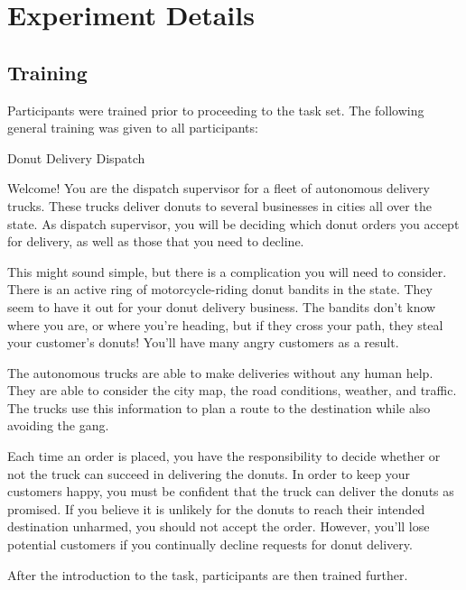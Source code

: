\section{Experiment Details}
\subsection{Training}
Participants were trained prior to proceeding to the task set. The following general training was given to all participants:

\begin{quoting}
    Donut Delivery Dispatch

    Welcome! You are the dispatch supervisor for a fleet of autonomous delivery trucks. These trucks deliver donuts to several businesses in cities all over the state. As dispatch supervisor, you will be deciding which donut orders you accept for delivery, as well as those that you need to decline.

    This might sound simple, but there is a complication you will need to consider. There is an active ring of motorcycle-riding donut bandits in the state. They seem to have it out for your donut delivery business. The bandits don't know where you are, or where you're heading, but if they cross your path, they steal your customer's donuts! You'll have many angry customers as a result.

    The autonomous trucks are able to make deliveries without any human help. They are able to consider the city map, the road conditions, weather, and traffic. The trucks use this information to plan a route to the destination while also avoiding the gang.

    Each time an order is placed, you have the responsibility to decide whether or not the truck can succeed in delivering the donuts. In order to keep your customers happy, you must be confident that the truck can deliver the donuts as promised. If you believe it is unlikely for the donuts to reach their intended destination unharmed, you should not accept the order. However, you'll lose potential customers if you continually decline requests for donut delivery.
\end{quoting}

After the introduction to the task, participants are then trained further.

